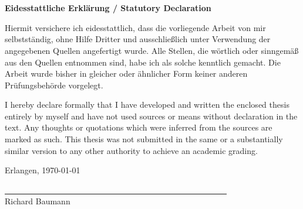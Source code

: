 %
% 


\chapter*{\ }


\vspace*{\fill}


\begin{Large}
	\textbf{Eidesstattliche Erklärung / Statutory Declaration}
\end{Large}
\vspace{1.5em}


Hiermit versichere ich eidesstattlich, dass die vorliegende Arbeit von mir selbstständig, ohne Hilfe Dritter und ausschließlich unter Verwendung der angegebenen Quellen angefertigt wurde. Alle Stellen, die wörtlich oder sinngemäß aus den Quellen entnommen sind, habe ich als solche kenntlich gemacht. Die Arbeit wurde bisher in gleicher oder ähnlicher Form keiner anderen Prüfungsbehörde vorgelegt. 
\vspace{1.5em}




I hereby declare formally that I have developed and written the enclosed thesis entirely by myself and have not used sources or means without declaration in the text. Any thoughts or quotations which were inferred from the sources are marked as such. This thesis was not submitted in the same or a substantially similar version to any other authority to achieve an academic grading. 
\vspace{2em}


Erlangen, \today\\
\begin{flushright}
	\underline{\ \ \ \ \ \ \ \ \ \ \ \ \ \ \ \ \ \ \ \ \ \ \ \ \ 
		\ \ \ \ \ \ \ \ \ \ \ \ \ \ \ \ \ \ \ \ \ \ \ \ \ \ \ \ \ 
	}\\
	\small{Richard Baumann}
\end{flushright}
